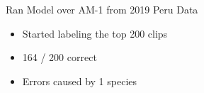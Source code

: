 
\begin{frame}{Ran Model over AM-1 from 2019 Peru Data}
    \begin{itemize}
        \item Started labeling the top 200 clips
        \item 164 / 200 correct
        \item Errors caused by 1 species
    \end{itemize}
\end{frame}

